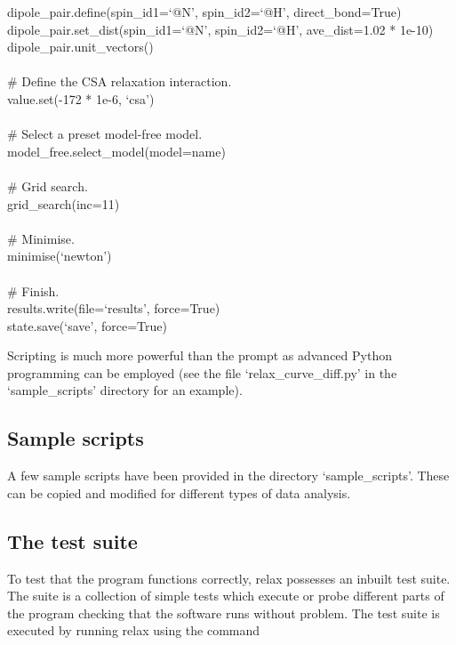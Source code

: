 \begin{exampleenv}
dipole\_pair.define(spin\_id1=`@N', spin\_id2=`@H', direct\_bond=True) \\
dipole\_pair.set\_dist(spin\_id1=`@N', spin\_id2=`@H', ave\_dist=1.02 * 1e-10) \\
dipole\_pair.unit\_vectors() \\
 \\
\# Define the CSA relaxation interaction. \\
value.set(-172 * 1e-6, `csa') \\
 \\
\# Select a preset model-free model. \\
model\_free.select\_model(model=name) \\
 \\
\# Grid search. \\
grid\_search(inc=11) \\
 \\
\# Minimise. \\
minimise(`newton') \\
 \\
\# Finish. \\
results.write(file=`results', force=True) \\
state.save(`save', force=True)
\end{exampleenv}

Scripting is much more powerful than the prompt as advanced Python programming can be employed (see the file `relax\_curve\_diff.py' in the `sample\_scripts' directory for an example).




\subsection{Sample scripts}

A few sample scripts have been provided in the directory `sample\_scripts'.  These can be copied and modified for different types of data analysis.




\subsection{The test suite}

To test that the program functions correctly, relax possesses an inbuilt test suite.  The suite is a collection of simple tests which execute or probe different parts of the program checking that the software runs without problem.  The test suite is executed by running relax using the command

